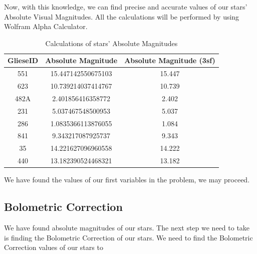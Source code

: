 \documentclass[a4paper,10pt]{article}
\begin{document}
  Now, with this knowledge, we can find precise and accurate values of our stars' Absolute Visual Magnitudes. All the calculations will
 be performed by using Wolfram Alpha Calculator.
\begin{table}[h!]
    \begin{center}
      \caption{Calculations of stars' Absolute Magnitudes}
      \begin{tabular}{c | c | c}
        \textbf{GlieseID} & \textbf{Absolute Magnitude} & \textbf{Absolute Magnitude (3sf)}\\
        \hline
        551 & 15.447142550675103 & 15.447\\
        623 & 10.739214037414767 & 10.739\\
        482A & 2.401856416358772 & 2.402\\
        231 & 5.037467548500953 & 5.037\\
        286 & 1.0835366113876055 & 1.084\\
        841 & 9.343217087925737 & 9.343\\
        35& 14.221627096960558 & 14.222\\
        440 & 13.182390524468321 & 13.182\\
        
      \end{tabular}
      \label{avm}
    \end{center}
  \end{table}
  
We have found the values of our first variables in the problem, we may proceed.

\subsection{Bolometric Correction}

We have found absolute magnitudes of our stars. The next step we need to take is finding the Bolometric Correction of our stars.
We need to find the Bolometric Correction values of our stars to 











  
  \singlespacing
  \newpage
  \tiny
  \appendix
\end{document}
